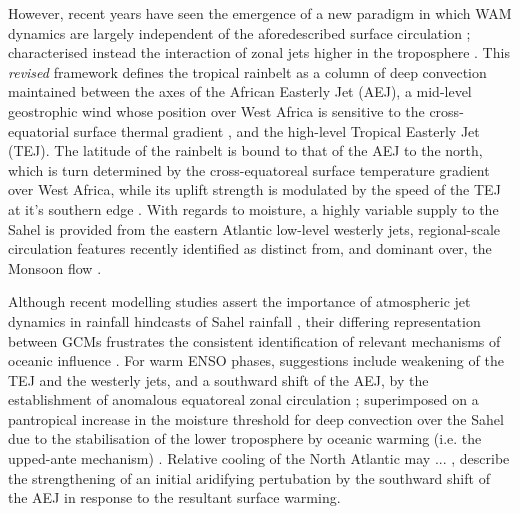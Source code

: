 \documentclass[a4paper]{article}
\begin{document}
However, recent years have seen the emergence of a new paradigm in which WAM dynamics are largely independent of the aforedescribed surface circulation \parencite{grist2001study}; characterised instead the interaction of zonal jets higher in the troposphere \parencite[see][for a comprehensive overview]{nicholson2009revised}.
This \emph{revised} framework defines the tropical rainbelt as a column of deep convection maintained between the axes of the African Easterly Jet (AEJ), a mid-level geostrophic wind whose position over West Africa is sensitive to the cross-equatorial surface thermal gradient \parencite{cook1999generation}, and the high-level Tropical Easterly Jet (TEJ).
The latitude of the rainbelt is bound to that of the AEJ to the north, which is turn determined by the cross-equatoreal surface temperature gradient over West Africa, while its uplift strength is modulated by the speed of the TEJ at it's southern edge \parencite{gu2004seasonal, nicholson2009revised, nicholson2013west}.
With regards to moisture, a highly variable supply to the Sahel is provided from the eastern Atlantic low-level westerly jets, regional-scale circulation features recently identified as distinct from, and dominant over, the Monsoon flow \parencite{grodsky2003near, pu2010dynamics, nicholson2013west}.

Although recent modelling studies assert the importance of atmospheric jet dynamics in rainfall hindcasts of Sahel rainfall \parencite{philippon2010skill, xue2010intercomparison, ruti2011west, diallo2013interannual, tseng2016diagnosing}, their differing representation between GCMs frustrates the consistent identification of relevant mechanisms of oceanic influence \parencite{caminade2010twentieth, druyan2011studies}.
For warm ENSO phases, suggestions include weakening of the TEJ and the westerly jets, and a southward shift of the AEJ, by the establishment of anomalous equatoreal zonal circulation \parencite{joly2009influence, okonkwo2015combined, villamayor2015robust, preethi2015impacts}; superimposed on a pantropical increase in the moisture threshold for deep convection over the Sahel due to the stabilisation of the lower troposphere by oceanic warming (i.e. the upped-ante mechanism) \parencite{neelin2003tropical, caminade2010twentieth, liu2014atmospheric}. 
Relative cooling of the North Atlantic may ... ,
\citeauthor{liu2014atmospheric}\parencite{liu2014atmospheric} describe the strengthening of an initial aridifying pertubation by the southward shift of the AEJ in response to the resultant surface warming.
\end{document}
